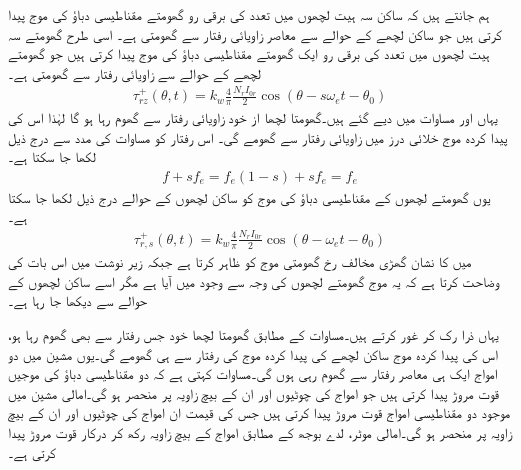 ہم جانتے ہیں کہ ساکن سہ ہیت لچھوں میں  تعدد کی  برقی رو   گھومتے مقناطیسی دباؤ کی موج پیدا کرتی  ہیں جو ساکن لچھے کے حوالے سے   معاصر زاویائی رفتار سے گھومتی ہے۔ اسی طرح گھومتے سہ ہیت لچھوں میں  تعدد کی برقی رو ایک گھومتے مقناطیسی دباؤ کی موج  پیدا کرتی ہیں جو گھومتے لچھے کے حوالے سے   زاویائی رفتار سے گھومتی ہے۔
\begin{align}
\tau_{rz}^+(\theta,t)=k_w \frac{4}{\pi} \frac{N_r I_{0r}}{2} \cos \left(\theta-s \omega_e t -\theta_0 \right)
\end{align}
یہاں   اور  مساوات  میں دیے گئے ہیں۔گھومتا لچھا از خود  زاویائی رفتار سے گھوم رہا ہو گا لہٰذا اس کی پیدا کردہ  موج خلائی درز  میں  زاویائی رفتار سے گھومے گی۔ اس رفتار کو مساوات   کی مدد سے درج ذیل لکھا جا سکتا ہے۔
\begin{align}
f+s f_e= f_e (1-s)+ s f_e=f_e
\end{align}
یوں  گھومتے لچھوں کے مقناطیسی دباؤ کی موج کو ساکن لچھوں کے حوالے درج ذیل لکھا جا سکتا ہے۔
\begin{align}\label{مساوات_امالی_گھومتے_حصے_کی_موج}
\tau_{r,s}^+(\theta,t)=k_w \frac{4}{\pi} \frac{N_r I_{0r}}{2} \cos \left(\theta-\omega_e t -\theta_0 \right)
\end{align}
 میں  کا نشان گھڑی  مخالف رخ گھومتی موج کو ظاہر کرتا ہے جبکہ زیر نوشت  میں  اس بات کی وضاحت کرتا ہے کہ یہ موج گھومتے لچھوں کی وجہ سے وجود میں آیا ہے مگر اسے ساکن لچھوں کے حوالے سے دیکھا جا رہا ہے۔

یہاں ذرا رک کر غور کرتے ہیں۔مساوات   کے مطابق گھومتا لچھا خود جس  رفتار سے بھی  گھوم رہا ہو، اس کی پیدا کردہ  موج ساکن لچھے کی پیدا کردہ موج کی رفتار سے ہی گھومے گی۔یوں  مشین میں دو امواج ایک ہی معاصر رفتار سے گھوم رہی ہوں گی۔مساوات   کہتی ہے کہ دو مقناطیسی دباؤ کی موجیں قوت مروڑ  پیدا کرتی ہیں جو امواج کی چوٹیوں اور ان کے بیچ  زاویہ پر منحصر ہو گی۔امالی مشین میں موجود دو مقناطیسی امواج قوت مروڑ  پیدا کرتی ہیں جس کی قیمت ان  امواج کی چوٹیوں اور ان  کے بیچ زاویہ پر منحصر ہو گی۔امالی موٹر،  لدے بوجھ کے مطابق امواج کے بیچ زاویہ رکھ کر درکار  قوت مروڑ پیدا کرتی ہے۔

